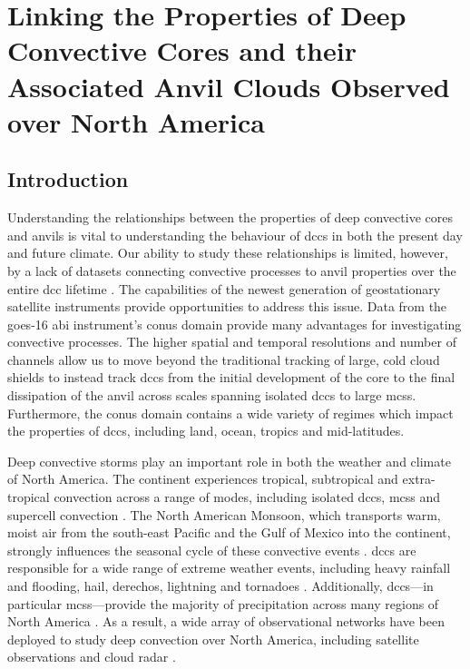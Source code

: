\chapter{Linking the Properties of Deep Convective Cores and their Associated Anvil Clouds Observed over North America} \label{chp:lifecycle}


\section{Introduction}  %

Understanding the relationships between the properties of deep convective cores and anvils is vital to understanding the behaviour of \acrshort{dcc}s in both the present day and future climate.
Our ability to study these relationships is limited, however, by a lack of datasets connecting convective processes to anvil properties over the entire \acrshort{dcc} lifetime \citep{gasparini_opinion_2023}.
The capabilities of the newest generation of geostationary satellite instruments provide opportunities to address this issue.
Data from the \acrshort{goes}-16 \acrshort{abi} instrument's \acrshort{conus} domain provide many advantages for investigating convective processes.
The higher spatial and temporal resolutions and number of channels allow us to move beyond the traditional tracking of large, cold cloud shields to instead track \acrshort{dcc}s from the initial development of the core to the final dissipation of the anvil across scales spanning isolated \acrshort{dcc}s to large \acrshort{mcs}s.
Furthermore, the \acrshort{conus} domain contains a wide variety of regimes which impact the properties of \acrshort{dcc}s, including land, ocean, tropics and mid-latitudes.

Deep convective storms play an important role in both the weather and climate of North America.
The continent experiences tropical, subtropical and extra-tropical convection across a range of modes, including isolated \acrshort{dcc}s, \acrshort{mcs}s and supercell convection \citep{brooks_century_2019}.
The North American Monsoon, which transports warm, moist air from the south-east Pacific and the Gulf of Mexico into the continent, strongly influences the seasonal cycle of these convective events \citep{adams_north_1997, higgins_intercomparison_2001}.
\acrshort{dcc}s are responsible for a wide range of extreme weather events, including heavy rainfall and flooding, hail, derechos, lightning and tornadoes \citep{westra_future_2014, houze_chapter_2014, williams_radar_1992, bruning_theory_2013, punge_hail_2016, matsudo_severe_2011}.
Additionally, \acrshort{dcc}s---in particular \acrshort{mcs}s---provide the majority of precipitation across many regions of North America \citep{feng_spatiotemporal_2019, li_high-resolution_2021}.
As a result, a wide array of observational networks have been deployed to study deep convection over North America, including satellite observations and cloud radar \citep{brooks_century_2019}.

